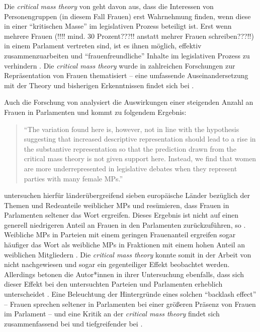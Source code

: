 \documentclass[12pt, 
    twoside=false, 
    bibliography=totoc, 
    numbers=endperiod, 
    headings=normal, 
    toc=chapterentrydotfill
    ]{scrbook}
\begin{document}
Die \emph{critical mass theory} von \textcite{dahlerup_1988} geht davon aus, dass die Interessen von Personengruppen (in diesem Fall Frauen) erst Wahrnehmung finden, wenn diese in einer \enquote{kritischen Masse} im legislativen Prozess beteiligt ist. Erst wenn mehrere Frauen (!!!! mind. 30 Prozent???!! anstatt mehrer Frauen schreiben???!!) in einem Parlament vertreten sind, ist es ihnen möglich, effektiv zusammenzuarbeiten und \enquote{frauenfreundliche} Inhalte im legislativen Prozess zu verhindern \parencite[752]{childs_2008}.
Die \emph{critical mass theory} wurde in zahlreichen Forschungen zur Repräsentation von Frauen thematisiert -- eine umfassende Auseinandersetzung mit der Theory und bisherigen Erkenntnissen findet sich bei \textcite{childs_2008}. 

Auch die Forschung von \textcite{back_2018} analysiert die Auswirkungen einer steigenden Anzahl an Frauen in Parlamenten und kommt zu folgendem Ergebnis: 

\citereset
\begin{quote}
  \enquote{The variation found here is, however, not in line with the hypothesis suggesting that increased descriptive representation should lead to a rise in the substantive representation so that the prediction drawn from the critical mass theory is not given support here. Instead, we find that women are more underrepresented in legislative debates when they represent parties with many female MPs.}
  \parencite[17]{back_2018}
\end{quote}


\textcite{back_2018} untersuchen hierfür länderübergreifend sieben europäische Länder bezüglich der Themen und Redeanteile weiblicher MPs und resümieren, dass Frauen in Parlamenten seltener das Wort ergreifen. Dieses Ergebnis ist nicht auf einen generell niedrigeren Anteil an Frauen in den Parlamenten zurückzuführen, so \textcite{back_2018}. Weibliche MPs in Parteien mit einem geringen Frauenanteil ergreifen sogar häufiger das Wort als weibliche MPs in Fraktionen mit einem hohen Anteil an weiblichen Mitgliedern \parencite*[17]{back_2018}. Die \emph{critical mass theory} konnte somit in der Arbeit von \textcite{back_2018} nicht nachgewiesen und sogar ein gegenteiliger Effekt beobachtet werden. Allerdings betonen die Autor*innen in ihrer Untersuchung ebenfalls, dass sich dieser Effekt bei den untersuchten Parteien und Parlamenten erheblich unterscheidet \parencite[17]{back_2018}. Eine Beleuchtung der Hintergründe eines solchen \enquote{backlash effect} -- Frauen sprechen seltener in Parlamenten bei einer größeren Präsenz von Frauen im Parlament -- und eine Kritik an der \emph{critical mass theory} findet sich zusammenfassend bei \textcite[4]{back_2018} und tiefgreifender bei \textcite{childs_2008}.
\end{document}
